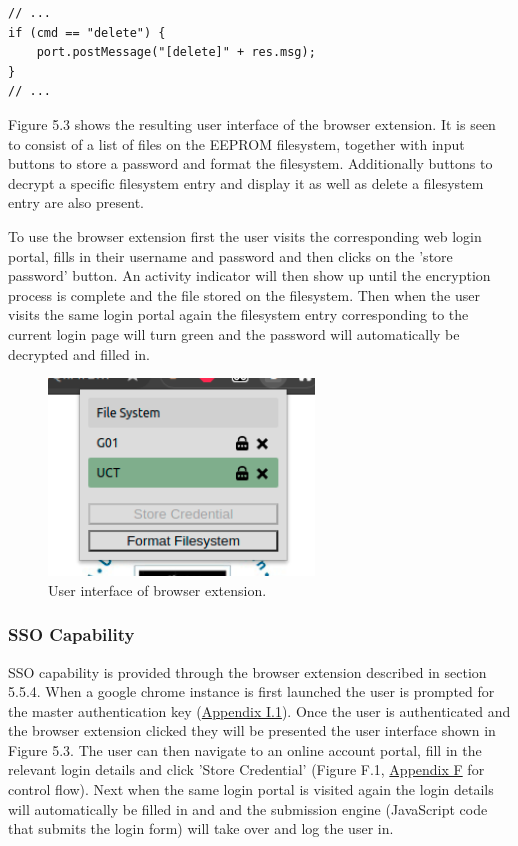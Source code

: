 \begin{lstlisting}[]
// ...
if (cmd == "delete") {
    port.postMessage("[delete]" + res.msg);
}
// ...
\end{lstlisting}

Figure 5.3 shows the resulting user interface of the browser extension. It is seen to consist of a list of files on the EEPROM filesystem, together with input buttons to store a password and format the filesystem. Additionally buttons to decrypt a specific filesystem entry and display it as well as delete a filesystem entry are also present.

To use the browser extension first the user visits the corresponding web login portal, fills in their username and password and then clicks on the 'store password' button. An activity indicator will then show up until the encryption process is complete and the file stored on the filesystem. Then when the user visits the same login portal again the filesystem entry corresponding to the current login page will turn green and the password will automatically be decrypted and filled in.

\begin{figure}[H]
\centering
\includegraphics[width=0.35\columnwidth]{Figures/Fig_53.png}
\caption{User interface of browser extension.}
\label{fig:gantt}
\end{figure}

\subsubsection{SSO Capability}

SSO capability is provided through the browser extension described in section 5.5.4. When a google chrome instance is first launched the user is prompted for the master authentication key (\hyperref[sec:bext1]{Appendix I.1}). Once the user is authenticated and the browser extension clicked they will be presented the user interface shown in Figure 5.3. The user can then navigate to an online account portal, fill in the relevant login details and click 'Store Credential' (Figure F.1, \hyperref[sec:credflow]{Appendix F} for control flow). Next when the same login portal is visited again the login details will automatically be filled in and and the submission engine (JavaScript code that submits the login form) will take over and log the user in.

